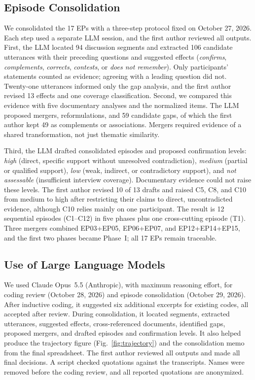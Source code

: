 \documentclass[sigconf,nonacm]{acmart}
\newif\ifshownotes
\newcommand{\isnote}[1]{\ifshownotes{\color{purple}\textbf{[IS:} #1\textbf{]}}\fi}
\begin{document}

\subsection{Episode Consolidation}
\label{sec:consolidacao}

We consolidated the 17 EPs with a three-step protocol fixed on October 27, 2026. Each step used a separate LLM session, and the first author reviewed all outputs. First, the LLM located 94 discussion segments and extracted 106 candidate utterances with their preceding questions and suggested effects (\emph{confirms}, \emph{complements}, \emph{corrects}, \emph{contests}, or \emph{does not remember}). Only participants' statements counted as evidence; agreeing with a leading question did not. Twenty-one utterances informed only the gap analysis, and the first author revised 13 effects and one coverage classification. Second, we compared this evidence with five documentary analyses and the normalized items. The LLM proposed mergers, reformulations, and 59 candidate gaps, of which the first author kept 49 as complements or associations. Mergers required evidence of a shared transformation, not just thematic similarity.

Third, the LLM drafted consolidated episodes and proposed confirmation levels: \emph{high} (direct, specific support without unresolved contradiction), \emph{medium} (partial or qualified support), \emph{low} (weak, indirect, or contradictory support), and \emph{not assessable} (insufficient interview coverage). Documentary evidence could not raise these levels. The first author revised 10 of 13 drafts and raised C5, C8, and C10 from medium to high after restricting their claims to direct, uncontradicted evidence, although C10 relies mainly on one participant. The result is 12 sequential episodes (C1--C12) in five phases plus one cross-cutting episode (T1). Three mergers combined EP03+EP05, EP06+EP07, and EP12+EP14+EP15, and the first two phases became Phase~I; all 17 EPs remain traceable.

\subsection{Use of Large Language Models}
\label{sec:llm}
We used Claude Opus~5.5 (Anthropic), with maximum reasoning effort, for coding review (October 28, 2026) and episode consolidation (October 29, 2026). After inductive coding, it suggested six additional excerpts for existing codes, all accepted after review. During consolidation, it located segments, extracted utterances, suggested effects, cross-referenced documents, identified gaps, proposed mergers, and drafted episodes and confirmation levels. It also helped produce the trajectory figure (Fig.~\ref{fig:trajectory}) and the consolidation memo from the final spreadsheet. The first author reviewed all outputs and made all final decisions. A script checked quotations against the transcripts. Names were removed before the coding review, and all reported quotations are anonymized. 
\end{document}
